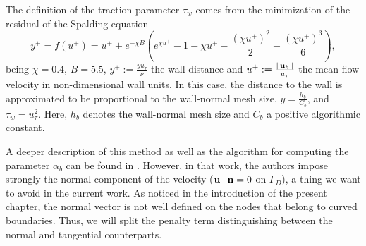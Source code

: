 The definition of the traction parameter $ \tau_w $ comes from the minimization of the residual of the Spalding equation
\begin{equation}
\label{eq-C7_spalding}
y^+=f(u^+)=u^++e^{-\chi B}\left(e^{\chi u^+}-1-\chi u^+-\frac{\left(\chi u^+\right)^2}{2}-\frac{\left(\chi u^+\right)^3}{6}\right),
\end{equation}
being $ \chi=0.4 $, $ B=5.5 $, $ y^+:=\frac{yu_\tau}{\nu} $ the wall distance and $ u^+:=\frac{\|{\bf u}_h\|}{u_\tau} $ the mean flow velocity in non-dimensional wall units. In this case, the distance to the wall is approximated to be proportional to the wall-normal mesh size, $ y=\frac{h_b}{C_b} $, and $ \tau_w=u_\tau^2 $. Here, $ h_b $ denotes the wall-normal mesh size and $ C_b $ a positive algorithmic constant.

A deeper description of this method as well as the algorithm for computing the parameter $\alpha_b$ can be found in \cite{bazilevs_weak_2007}. However, in that work, the authors impose strongly the normal component of the velocity ($ {\bf u}\cdot{\bf n}=0 $ on $ \Gamma_D $), a thing we want to avoid in the current work. As noticed in the introduction of the present chapter, the normal vector is not well defined on the nodes that belong to curved boundaries. Thus, we will split the penalty term distinguishing between the normal and tangential counterparts. 

